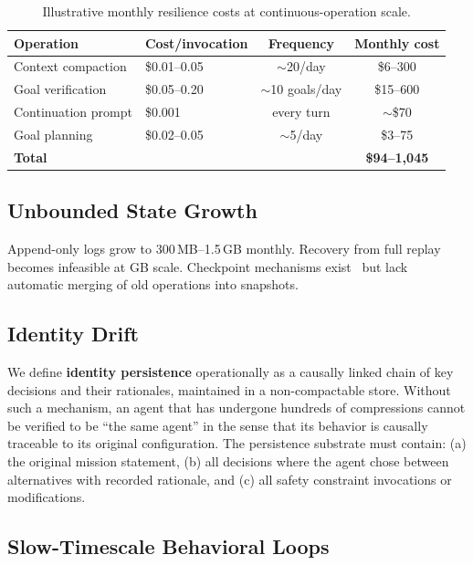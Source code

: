 \documentclass{article}
\begin{document}
\begin{table}[h]
\centering
\caption{Illustrative monthly resilience costs at continuous-operation scale.}
\label{tab:cost}
\small
\begin{tabular}{llcc}
\toprule
\textbf{Operation} & \textbf{Cost/invocation} & \textbf{Frequency} & \textbf{Monthly cost} \\
\midrule
Context compaction & \$0.01--0.05 & ${\sim}$20/day & \$6--300 \\
Goal verification & \$0.05--0.20 & ${\sim}$10 goals/day & \$15--600 \\
Continuation prompt & \$0.001 & every turn & ${\sim}$\$70 \\
Goal planning & \$0.02--0.05 & ${\sim}$5/day & \$3--75 \\
\midrule
\textbf{Total} & & & \textbf{\$94--1,045} \\
\bottomrule
\end{tabular}
\end{table}

\subsection{Unbounded State Growth}

Append-only logs grow to 300\,MB--1.5\,GB monthly. Recovery from full replay becomes infeasible at GB scale. Checkpoint mechanisms exist~\cite{grokbuild_sqlite} but lack automatic merging of old operations into snapshots.

\subsection{Identity Drift}

We define \textbf{identity persistence} operationally as a causally linked chain of key decisions and their rationales, maintained in a non-compactable store. Without such a mechanism, an agent that has undergone hundreds of compressions cannot be verified to be ``the same agent'' in the sense that its behavior is causally traceable to its original configuration. The persistence substrate must contain: (a) the original mission statement, (b) all decisions where the agent chose between alternatives with recorded rationale, and (c) all safety constraint invocations or modifications.

\subsection{Slow-Timescale Behavioral Loops}
\end{document}
